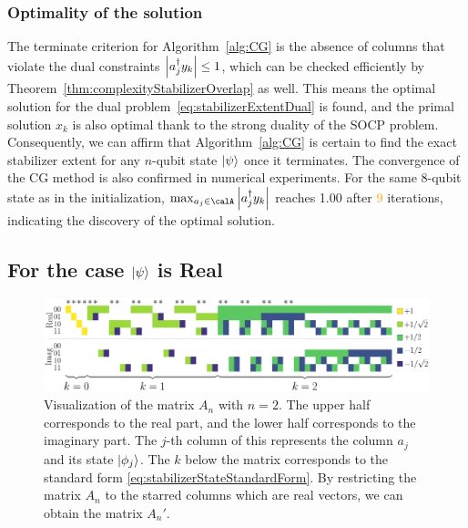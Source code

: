 \documentclass[a4paper, onecolumn, 11pt, longbibliography]{quantumarticle}
\newcommand{\orange}[1]{\textcolor{orange}{#1}}
\begin{document}
\subsubsection{Optimality of the solution}

The terminate criterion for Algorithm~\ref{alg:CG}
is the absence of columns that violate
the dual constraints $\abs{a_j^\dagger y_k} \leq 1$,
which can be checked efficiently
by Theorem~\ref{thm:complexityStabilizerOverlap} as well.
This means the optimal solution for the
dual problem~\eqref{eq:stabilizerExtentDual}
is found, and the primal solution $x_k$ is also optimal
thank to the strong duality of the SOCP problem.
Consequently, we can affirm that
Algorithm~\ref{alg:CG} is certain to
find the exact stabilizer extent
for any $n$-qubit state $\ket{\psi}$
once it terminates.
The convergence of the CG method
is also confirmed in numerical experiments.
For the same 8-qubit state as in the initialization,
$\max_{a_j \in \calA} \abs{a_j^\dagger y_k}$
reaches 1.00 after \orange{9} iterations,
indicating the discovery of the optimal solution.

\subsection{For the case $\ket{\psi}$ is Real}
\label{sec:restrictedRealProblem}

\begin{figure}[htbp]
  \centering
  \includegraphics[width=\columnwidth]{imgs/Amat.pdf}
  \caption{
    Visualization of the matrix $A_n$ with $n=2$.
    The upper half corresponds to the real part,
    and the lower half corresponds to the imaginary part.
    The $j$-th column of this represents
    the column $a_j$ and its state $\ket{\phi_j}$.
    The $k$ below the matrix
    corresponds to
    the standard form \eqref{eq:stabilizerStateStandardForm}.
    By restricting the matrix $A_n$
    to the starred columns
    which are real vectors,
    we can obtain the matrix $A_n'$.
  }
  \label{fig:Amat}
\end{figure}
\end{document}
